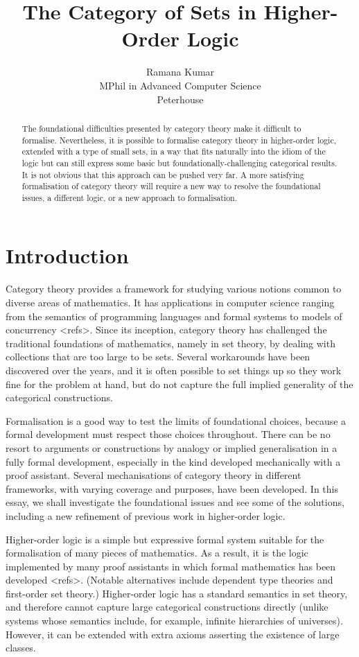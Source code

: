 \documentclass[twoside,titlepage,11pt]{article}
\title{The Category of Sets in Higher-Order Logic}
\author{Ramana Kumar\\MPhil in Advanced Computer Science\\Peterhouse}
\begin{document}
\maketitle
\begin{abstract}%
The foundational difficulties presented by category theory make it difficult to formalise.
Nevertheless, it is possible to formalise category theory in higher-order logic, extended with a type of small sets, in a way that fits naturally into the idiom of the logic but can still express some basic but foundationally-challenging categorical results.
It is not obvious that this approach can be pushed very far.
A more satisfying formalisation of category theory will require a new way to resolve the foundational issues, a different logic, or a new approach to formalisation.
\end{abstract}%
\section{Introduction}%
Category theory provides a framework for studying various notions common to diverse areas of mathematics.
It has applications in computer science ranging from the semantics of programming languages and formal systems to models of concurrency <refs>.
Since its inception, category theory has challenged the traditional foundations of mathematics, namely in set theory, by dealing with collections that are too large to be sets. 
Several workarounds have been discovered over the years, and it is often possible to set things up so they work fine for the problem at hand, but do not capture the full implied generality of the categorical constructions.

Formalisation is a good way to test the limits of foundational choices, because a formal development must respect those choices throughout.
There can be no resort to arguments or constructions by analogy or implied generalisation in a fully formal development, especially in the kind developed mechanically with a proof assistant.
Several mechanisations of category theory in different frameworks, with varying coverage and purposes, have been developed.
In this essay, we shall investigate the foundational issues and see some of the solutions, including a new refinement of previous work in higher-order logic.

Higher-order logic is a simple but expressive formal system suitable for the formalisation of many pieces of mathematics.
As a result, it is the logic implemented by many proof assistants in which formal mathematics has been developed <refs>.
(Notable alternatives include dependent type theories and first-order set theory.)
Higher-order logic has a standard semantics in set theory, and therefore cannot capture large categorical constructions directly (unlike systems whose semantics include, for example, infinite hierarchies of universes).
However, it can be extended with extra axioms asserting the existence of large classes.
\end{document}
